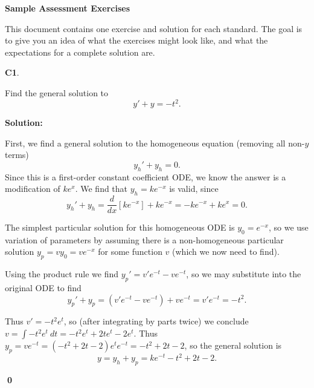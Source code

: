\documentclass{article}
\newenvironment{problem}[1]
{
  \begin{flushleft}
  \textbf{#1}.
  \ignorespaces
}
{
  \end{flushleft}
}
\newenvironment{solution}
{
  \ignorespaces
  \textbf{Solution:}
}
{
  \ignorespacesafterend
  \begin{flushright}
  {\bfseries \qed}
  \end{flushright}
}
\begin{document}
\begin{center}
\Large \textbf{Sample Assessment Exercises}
\end{center}

This document contains one exercise and solution for each standard.
The goal is to give you an idea of what the exercises might look like,
and what the expectations for a complete solution are.



\begin{problem}{C1}
Find the general solution to \[y'+y=-t^2.\]
\end{problem}
\begin{solution}
First, we find a general solution to the homogeneous equation (removing all non-\(y\) terms) 
\[y_h'+y_h=0.\]
Since this is a first-order constant coefficient ODE, we know the answer is a modification of
\(ke^x\). We find that \(y_h=ke^{-x}\) is valid, since
\[y_h'+y_h=\frac{d}{dx}[ke^{-x}]+ke^{-x}=-ke^{-x}+ke^{x}=0.\]

The simplest particular solution for this homogeneous ODE is \(y_0=e^{-x}\),
so we use variation of parameters by assuming there is a non-homogeneous particular solution
\(y_p=vy_0=ve^{-x}\) for some function \(v\) (which we now need to find).

Using the product rule we find \(y_p' = v'e^{-t}-ve^{-t}\), so we may substitute into the original ODE to find
\[y_p ' + y_p = (v'e^{-t}-ve^{-t}) + ve^{-t} = v'e^{-t}=-t^2.\]

Thus \(v'=-t^2e^t\), so (after integrating by parts twice) we conclude \(v=\int -t^2 e^t\ dt  = -t^2 e^t +2te^t-2e^t\).  
Thus \(y_p = ve^{-t} = (-t^2+2t-2)e^te^{-t}=-t^2+2t-2\), so the general solution is 
\[y=y_h+y_p=ke^{-t}-t^2+2t-2.\]
\end{solution}






%
\end{document}

